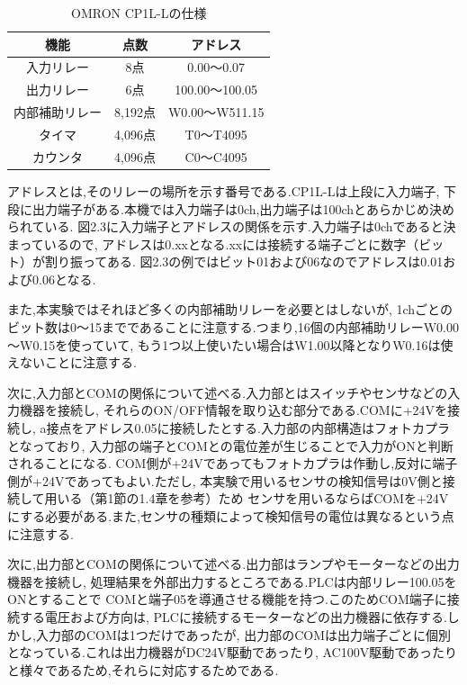 \begin{table}[h]
  \centering
  \caption{OMRON CP1L-Lの仕様}
  \begin{tabular}{|c|c|c|}
    \hline
    機能           & 点数    & アドレス       \\ \hline
    入力リレー     & 8点     & 0.00～0.07     \\ \hline
    出力リレー     & 6点     & 100.00～100.05 \\ \hline
    内部補助リレー & 8,192点 & W0.00～W511.15 \\ \hline
    タイマ         & 4,096点 & T0～T4095      \\ \hline
    カウンタ       & 4,096点 & C0～C4095      \\ \hline
  \end{tabular}
\end{table}

アドレスとは,そのリレーの場所を示す番号である.CP1L-Lは上段に入力端子,
下段に出力端子がある.本機では入力端子は0ch,出力端子は100chとあらかじめ決められている.
図2.3に入力端子とアドレスの関係を示す.入力端子は0chであると決まっているので,
アドレスは0.xxとなる.xxには接続する端子ごとに数字（ビット）が割り振ってある.
図2.3の例ではビット01および06なのでアドレスは0.01および0.06となる.

また,本実験ではそれほど多くの内部補助リレーを必要とはしないが,
1chごとのビット数は0～15までであることに注意する.つまり,16個の内部補助リレーW0.00～W0.15を使っていて,
もう1つ以上使いたい場合はW1.00以降となりW0.16は使えないことに注意する.

次に,入力部とCOMの関係について述べる.入力部とはスイッチやセンサなどの入力機器を接続し,
それらのON/OFF情報を取り込む部分である.COMに+24Vを接続し,
a接点をアドレス0.05に接続したとする.入力部の内部構造はフォトカプラとなっており,
入力部の端子とCOMとの電位差が生じることで入力がONと判断されることになる.
COM側が+24Vであってもフォトカプラは作動し,反対に端子側が+24Vであってもよい.ただし,
本実験で用いるセンサの検知信号は0V側と接続して用いる（第1節の1.4章を参考）ため
センサを用いるならばCOMを+24Vにする必要がある.また,センサの種類によって検知信号の電位は異なるという点に注意する.

次に,出力部とCOMの関係について述べる.出力部はランプやモーターなどの出力機器を接続し,
処理結果を外部出力するところである.PLCは内部リレー100.05をONとすることで
COMと端子05を導通させる機能を持つ.このためCOM端子に接続する電圧および方向は,
PLCに接続するモーターなどの出力機器に依存する.しかし,入力部のCOMは1つだけであったが,
出力部のCOMは出力端子ごとに個別となっている.これは出力機器がDC24V駆動であったり,
AC100V駆動であったりと様々であるため,それらに対応するためである.

